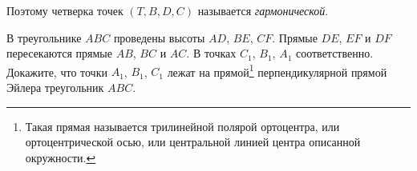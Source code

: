 \begin{tasks}
{                        Поэтому четверка точек  $\left( T, B, D, C \right) $ называется \emph{гармонической}.
                    }

                \item В треугольнике $ABC$ проведены высоты $AD$, $BE$, $CF$. Прямые $DE$, $EF$ и $DF$ пересекаются прямые $AB$, $BC$ и $AC$. В точках $C_1$, $B_1$, $A_1$ соответственно. Докажите, что точки $A_1$, $B_1$, $C_1$ лежат на прямой\footnote{Такая прямая называется трилинейной полярой ортоцентра, или ортоцентрической осью, или центральной линией центра описанной окружности.} перпендикулярной прямой Эйлера треугольник $ABC$.



\end{tasks}
